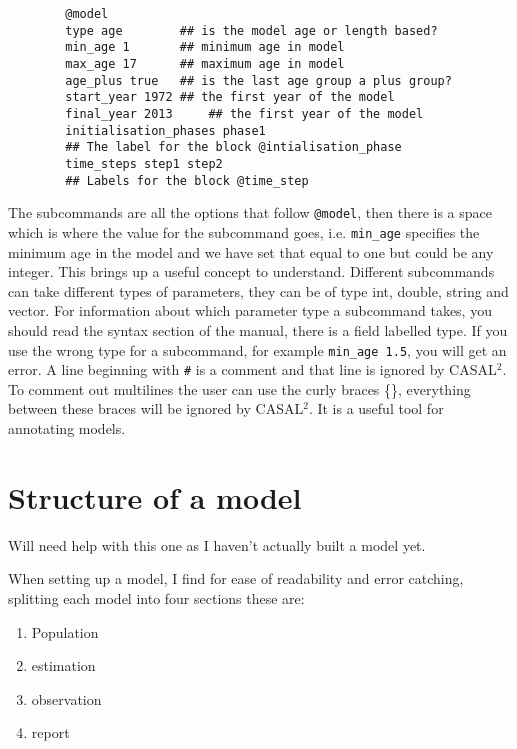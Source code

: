 \documentclass[12pt]{article}
\makeatletter
\newcommand{\CAS}{CASAL$^2$}
\newcommand{\command}[1] {\texttt{@#1}}
\makeatother
\begin{document}
{\small{\begin{verbatim}
		@model
		type age		## is the model age or length based?
		min_age 1		## minimum age in model
		max_age 17		## maximum age in model
		age_plus true	## is the last age group a plus group?
		start_year 1972	## the first year of the model
		final_year 2013 	## the first year of the model
		initialisation_phases phase1	
		## The label for the block @intialisation_phase
		time_steps step1 step2
		## Labels for the block @time_step
		\end{verbatim}}}
The subcommands are all the options that follow \command{model}, then there is a space which is where the value for the subcommand goes, i.e. \texttt{min\_age} specifies the minimum age in the model and we have set that equal to one but could be any integer. This brings up a useful concept to understand. Different subcommands can take different types of parameters, they can be of type int, double, string and vector. For information about which parameter type a subcommand takes, you should read the syntax section of the manual, there is a field labelled type. If you use the wrong type for a subcommand, for example \texttt{min\_age 1.5}, you will get an error. A line beginning with \texttt{\#} is a comment and that line is ignored by \CAS. To comment out multilines the user can use the curly braces \{\}, everything between these braces will be ignored by \CAS. It is a useful tool for annotating models. 


\section{Structure of a model}\label{Sec:model}
Will need help with this one as I haven't actually built a model yet. 

When setting up a model, I find for ease of readability and error catching, splitting each model into four sections these are:

\begin{enumerate}
\item Population
\item estimation
\item observation
\item report
\end{enumerate}
\end{document}
